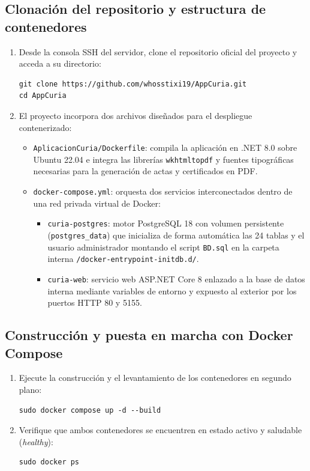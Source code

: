 \subsection{Clonación del repositorio y estructura de contenedores}
\begin{enumerate}
    \item Desde la consola SSH del servidor, clone el repositorio oficial del proyecto y acceda a su directorio:
    \begin{lstlisting}[style=consola]
git clone https://github.com/whosstixi19/AppCuria.git
cd AppCuria
\end{lstlisting}
    \item El proyecto incorpora dos archivos diseñados para el despliegue contenerizado:
    \begin{itemize}
        \item \texttt{AplicacionCuria/Dockerfile}: compila la aplicación en .NET 8.0 sobre Ubuntu 22.04 e integra las librerías \texttt{wkhtmltopdf} y fuentes tipográficas necesarias para la generación de actas y certificados en PDF.
        \item \texttt{docker-compose.yml}: orquesta dos servicios interconectados dentro de una red privada virtual de Docker:
        \begin{itemize}
            \item \texttt{curia-postgres}: motor PostgreSQL 18 con volumen persistente (\texttt{postgres\_data}) que inicializa de forma automática las 24 tablas y el usuario administrador montando el script \texttt{BD.sql} en la carpeta interna \texttt{/docker-entrypoint-initdb.d/}.
            \item \texttt{curia-web}: servicio web ASP.NET Core 8 enlazado a la base de datos interna mediante variables de entorno y expuesto al exterior por los puertos HTTP 80 y 5155.
        \end{itemize}
    \end{itemize}
\end{enumerate}

\subsection{Construcción y puesta en marcha con Docker Compose}
\begin{enumerate}
    \item Ejecute la construcción y el levantamiento de los contenedores en segundo plano:
    \begin{lstlisting}[style=consola]
sudo docker compose up -d --build
\end{lstlisting}
    \item Verifique que ambos contenedores se encuentren en estado activo y saludable (\textit{healthy}):
    \begin{lstlisting}[style=consola]
sudo docker ps
\end{lstlisting}
\end{enumerate}

